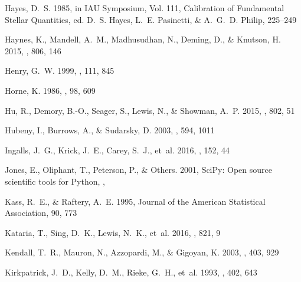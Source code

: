\documentclass[twocolumn, trackchanges]{aastex61}
\begin{document}
\begin{thebibliography}{}
{Hayes}, D.~S. 1985, in IAU Symposium, Vol. 111, Calibration of Fundamental
  Stellar Quantities, ed. D.~S. {Hayes}, L.~E. {Pasinetti}, \& A.~G.~D.
  {Philip}, 225--249

{Haynes}, K., {Mandell}, A.~M., {Madhusudhan}, N., {Deming}, D., \& {Knutson},
  H. 2015, \apj, 806, 146

{Henry}, G.~W. 1999, \pasp, 111, 845

{Horne}, K. 1986, \pasp, 98, 609

{Hu}, R., {Demory}, B.-O., {Seager}, S., {Lewis}, N., \& {Showman}, A.~P. 2015,
  \apj, 802, 51

{Hubeny}, I., {Burrows}, A., \& {Sudarsky}, D. 2003, \apj, 594, 1011

{Ingalls}, J.~G., {Krick}, J.~E., {Carey}, S.~J., {et~al.} 2016, \aj, 152, 44

Jones, E., Oliphant, T., Peterson, P., \& Others. 2001, {SciPy}: Open source
  scientific tools for Python, ,

Kass, R.~E., \& Raftery, A.~E. 1995, Journal of the American Statistical
  Association, 90, 773

{Kataria}, T., {Sing}, D.~K., {Lewis}, N.~K., {et~al.} 2016, \apj, 821, 9

{Kendall}, T.~R., {Mauron}, N., {Azzopardi}, M., \& {Gigoyan}, K. 2003, \aap,
  403, 929

{Kirkpatrick}, J.~D., {Kelly}, D.~M., {Rieke}, G.~H., {et~al.} 1993, \apj, 402,
  643


\end{thebibliography}
\end{document}
